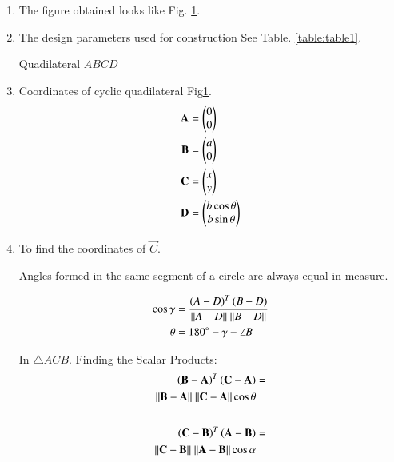 \renewcommand{\theequation}{\theenumi}
\begin{enumerate}[label=\thesection.\arabic*.,ref=\thesection.\theenumi]

\begin{figure}[!ht]
\centering
\resizebox{\columnwidth}{!}{}
\caption{Cyclic quadilateral by Latex-Tikz}
\label{fig:cyclic_quad}	
\end{figure}

\item The figure obtained looks like Fig. \ref{fig:cyclic_quad}.\\ 

\item The design parameters used for construction See Table. \ref{table:table1}.
\begin{table}[ht!]
\centering

\caption{Quadilateral $ABCD$}
\label{table:table1}	
\end{table} 

\item Coordinates of cyclic quadilateral Fig\ref{fig:cyclic_quad}. \\
\begin{align}
\mathbf{A} &=\begin{pmatrix}0\\0\end{pmatrix} \label{eq:constr_a}\\
\mathbf{B} &=\begin{pmatrix}a\\0\end{pmatrix} \label{eq:constr_b}\\
\mathbf{C} &=\begin{pmatrix}x\\y\end{pmatrix} \label{eq:constr_c}\\
\mathbf{D} &= \begin{pmatrix}b\cos{\theta}\\b\sin{\theta}\end{pmatrix}\label{eq:constr_d}
\end{align}

\item To find the coordinates of $\vec{C}$. 
\begin{theorem}
Angles formed in the same segment of a circle are always equal in measure.
\end{theorem} 
\begin{align}
\cos{\gamma} &= \frac{\left(A-D\right)^T\left(B-D\right)}{\| A -D \| \ \|B-D\|} \\
\theta &= 180\degree - \gamma - \angle B
\end{align}

In $\triangle ACB$. Finding the Scalar Products:
\begin{align}
\begin{split}\label{eq:scalar1}
\left(\mathbf{B} - \mathbf{A}\right)^T\left(\mathbf{C}-\mathbf{A}\right) &= \\ \|\mathbf{B} - \mathbf{A}\|
\ \| \mathbf{C}-\mathbf{A} \| \cos{\theta}
\end{split}\\ \nonumber\\
\begin{split}\label{eq:scalar2}
\left(\mathbf{C} - \mathbf{B}\right)^T\left(\mathbf{A}-\mathbf{B}\right) &= \\ 
\|\mathbf{C} - \mathbf{B}\|\ \| \mathbf{A}-\mathbf{B} \| \cos{\alpha}
\end{split}
\end{align}


\end{enumerate}

